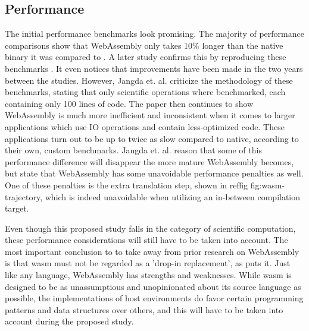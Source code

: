 
\subsection*{Performance}

The initial performance benchmarks look promising. The majority of performance comparisons show that WebAssembly only takes 10\% longer than the native binary it was compared to \cite{haas_bringing_2017}. A later study confirms this by reproducing these benchmarks \cite{jangda_not_2019}. It even notices that improvements have been made in the two years between the studies. However, Jangda et. al. criticize the methodology of these benchmarks, stating that only scientific operations where benchmarked, each containing only 100 lines of code. The paper then continues to show WebAssembly is much more inefficient and inconsistent when it comes to larger applications which use IO operations and contain less-optimized code. These applications turn out to be up to twice as slow compared to native, according to their own, custom benchmarks. Jangda et. al. reason that some of this performance difference will disappear the more mature WebAssembly becomes, but state that WebAssembly has some unavoidable performance penalties as well. One of these penalties is the extra translation step, shown in reffig fig:wasm-trajectory, which is indeed unavoidable when utilizing an in-between compilation target. 

Even though this proposed study falls in the category of scientific computation, these performance considerations will still have to be taken into account. The most important conclusion to to take away from prior research on WebAssembly is that \ac{wasm} must not be regarded as a 'drop-in replacement', as \cite{melch_performance_2019} puts it. Just like any language, WebAssembly has strengths and weaknesses. While \ac{wasm} is designed to be as unassumptious and unopinionated about its source language as possible, the implementations of host environments do favor certain programming patterns and data structures over others, and this will have to be taken into account during the proposed study.

